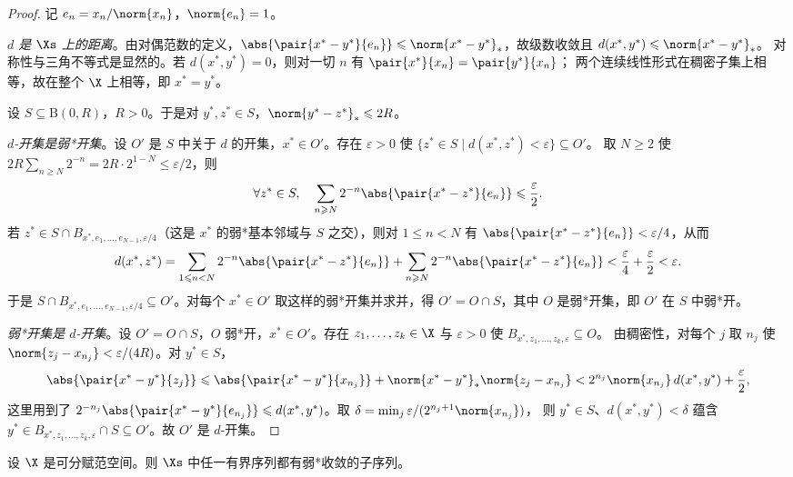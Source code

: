 \begin{proof}
记 $e_n=x_n/\norm{x_n}$，$\norm{e_n}=1$。

\emph{$d$ 是 $\Xs$ 上的距离}。由对偶范数的定义，$\abs{\pair{x^*-y^*}{e_n}}\leqslant\norm{x^*-y^*}_*$，故级数收敛且 $d(x^*,y^*)\leqslant\norm{x^*-y^*}_*$。
对称性与三角不等式是显然的。若 $d(x^*,y^*)=0$，则对一切 $n$ 有 $\pair{x^*}{x_n}=\pair{y^*}{x_n}$；
两个连续线性形式在稠密子集上相等，故在整个 $\X$ 上相等，即 $x^*=y^*$。

设 $S\subseteq\mathrm{B}(0,R)$，$R>0$。于是对 $y^*,z^*\in S$，$\norm{y^*-z^*}_*\leqslant2R$。

\emph{$d$-开集是弱*开集}。设 $O'$ 是 $S$ 中关于 $d$ 的开集，$x^*\in O'$。存在 $\varepsilon>0$ 使 $\{z^*\in S\mid d(x^*,z^*)<\varepsilon\}\subseteq O'$。
取 $N\geqslant2$ 使 $2R\sum_{n\geqslant N}2^{-n}=2R\cdot2^{1-N}\leqslant\varepsilon/2$，则
\[
  \forall z^*\in S,\quad\sum_{n\geqslant N}2^{-n}\abs{\pair{x^*-z^*}{e_n}}\leqslant\frac{\varepsilon}{2}.
\]
若 $z^*\in S\cap B_{x^*,e_1,\dots,e_{N-1},\varepsilon/4}$（这是 $x^*$ 的弱*基本邻域与 $S$ 之交），则对 $1\leqslant n<N$ 有 $\abs{\pair{x^*-z^*}{e_n}}<\varepsilon/4$，从而
\[
  d(x^*,z^*)=\sum_{1\leqslant n<N}2^{-n}\abs{\pair{x^*-z^*}{e_n}}+\sum_{n\geqslant N}2^{-n}\abs{\pair{x^*-z^*}{e_n}}<\frac{\varepsilon}{4}+\frac{\varepsilon}{2}<\varepsilon .
\]
于是 $S\cap B_{x^*,e_1,\dots,e_{N-1},\varepsilon/4}\subseteq O'$。对每个 $x^*\in O'$ 取这样的弱*开集并求并，得 $O'=O\cap S$，其中 $O$ 是弱*开集，即 $O'$ 在 $S$ 中弱*开。

\emph{弱*开集是 $d$-开集}。设 $O'=O\cap S$，$O$ 弱*开，$x^*\in O'$。存在 $z_1,\dots,z_k\in\X$ 与 $\varepsilon>0$ 使 $B_{x^*,z_1,\dots,z_k,\varepsilon}\subseteq O$。
由稠密性，对每个 $j$ 取 $n_j$ 使 $\norm{z_j-x_{n_j}}<\varepsilon/(4R)$。对 $y^*\in S$，
\[
  \abs{\pair{x^*-y^*}{z_j}}\leqslant\abs{\pair{x^*-y^*}{x_{n_j}}}+\norm{x^*-y^*}_*\norm{z_j-x_{n_j}}
  <2^{n_j}\norm{x_{n_j}}\,d(x^*,y^*)+\frac{\varepsilon}{2},
\]
这里用到了 $2^{-n_j}\abs{\pair{x^*-y^*}{e_{n_j}}}\leqslant d(x^*,y^*)$。取 $\delta=\min_j\varepsilon/(2^{n_j+1}\norm{x_{n_j}})$，
则 $y^*\in S$、$d(x^*,y^*)<\delta$ 蕴含 $y^*\in B_{x^*,z_1,\dots,z_k,\varepsilon}\cap S\subseteq O'$。故 $O'$ 是 $d$-开集。
\end{proof}

\begin{theorem}
\label{res:77}
设 $\X$ 是可分赋范空间。则 $\Xs$ 中任一有界序列都有弱*收敛的子序列。
\end{theorem}


